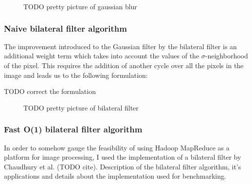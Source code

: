 \documentclass [12pt,a4paper]{report}
\begin{document}
\begin{center}
\begin{figure}[h]
\caption{TODO pretty picture of gaussian blur}
\label{fig_gaussian_blur}
\end{figure}
\end{center}

\subsubsection{Naive bilateral filter algorithm}

The improvement introduced to the Gaussian filter by the bilateral filter is an additional weight term which takes into account the values of the $\sigma$-neighborhood of the pixel. This requires the addition of another cycle over all the pixels in the image and leads us to the following formulation:

\begin{center}
\begin{algorithm}[H]
\end{algorithm}
\end{center}

TODO correct the formulation

\begin{center}
\begin{figure}[h]
\caption{TODO pretty picture of bilateral filter}
\label{fig_gaussian_blur}
\end{figure}
\end{center}

\subsubsection{Fast O(1) bilateral filter algorithm}

In order to somehow gauge the feasibility of using Hadoop MapReduce as a platform for image processing, I used the implementation of a bilateral filter by Chaudhury et al. (TODO cite).
Description of the bilateral filter algorithm, it's applications and details about the implementation used for benchmarking.
\end{document}
